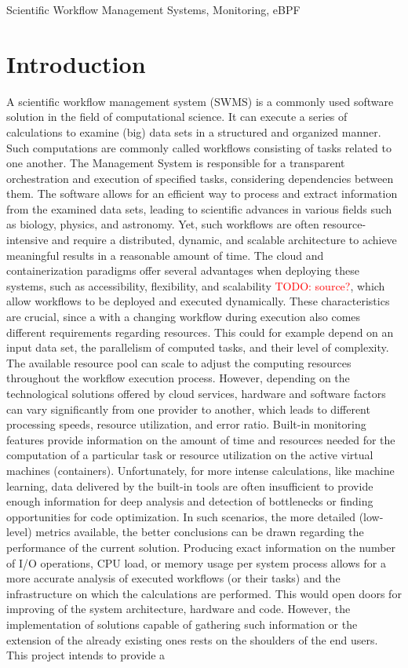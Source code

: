 \documentclass[lettersize,journal]{IEEEtran}
\newcommand{\todo}[1]{\textcolor{red}{TODO: #1}\PackageWarning{TODO:}{#1!}}
\begin{document}
\begin{IEEEkeywords}
	Scientific Workflow Management Systems, Monitoring, eBPF
\end{IEEEkeywords}

\section{Introduction}
A scientific workflow management system (SWMS) is a commonly used software solution in the field of computational science. It can execute a series of calculations to examine (big) data sets in a structured and organized manner. Such computations are commonly called workflows consisting of tasks related to one another. The Management System is responsible for a transparent orchestration and execution of specified tasks, considering dependencies between them. The software allows for an efficient way to process and extract information from the examined data sets, leading to scientific advances in various fields such as biology, physics, and astronomy\cite{gil2007examiningchallengesscientific}. Yet, such workflows are often resource-intensive and require a distributed, dynamic, and scalable architecture to achieve meaningful results in a reasonable amount of time. The cloud and containerization paradigms offer several advantages when deploying these systems, such as accessibility, flexibility, and scalability \todo{source?}, which allow workflows to be deployed and executed dynamically. These characteristics are crucial, since a with a changing workflow during execution also comes different requirements regarding resources. This could for example depend on an input data set, the parallelism of computed tasks, and their level of complexity. The available resource pool can scale to adjust the computing resources throughout the workflow execution process. However, depending on the technological solutions offered by cloud services, hardware and software factors can vary significantly from one provider to another, which leads to different processing speeds, resource utilization, and error ratio\cite{aljamal2018comparativereviewhighperformance}. Built-in monitoring features provide information on the amount of time and resources needed for the computation of a particular task or resource utilization on the active virtual machines (containers). Unfortunately, for more intense calculations, like machine learning, data delivered by the built-in tools are often insufficient to provide enough information for deep analysis and detection of bottlenecks or finding opportunities for code optimization. In such scenarios, the more detailed (low-level) metrics available, the better conclusions can be drawn regarding the performance of the current solution. Producing exact information on the number of I/O operations, CPU load, or memory usage per system process allows for a more accurate analysis of executed workflows (or their tasks) and the infrastructure on which the calculations are performed. This would open doors for improving of the system architecture, hardware and code. However, the implementation of solutions capable of gathering such information or the extension of the already existing ones rests on the shoulders of the end users. This project intends to provide a 
\end{document}

